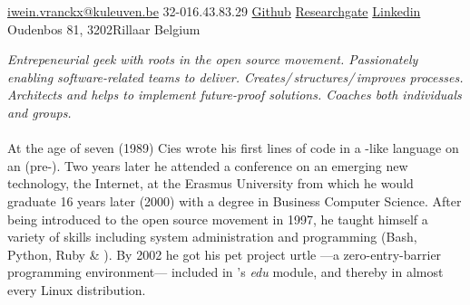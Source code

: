 \documentclass[10pt,a4paper]{article}
\begin{document}
\sloppy  %



\nobreakvspace{0.3em}  %

\noindent\href{mailto:ivranckx.at.kuleuven.dot.be}{\faInbox \; iwein.vranckx\mbox{}@\mbox{}kuleuven.be}\sbull
\faWhatsapp \; \textsmaller{+}32-016.43.83.29\sbull
\href{https://github.com/ivranckx}{\faGithub \; Github}\sbull
\href{https://www.researchgate.net/profile/Iwein_Vranckx}{\faPaperclip \; Researchgate}\sbull
\href{http://linkedin.com/in/ivranckx}{\faLinkedin \; Linkedin}
\\
\faMapMarker \; Oudenbos  81, 
3202\thinspace Rillaar\sbull%
Belgium

\spacedhrule{0.9em}{-0.4em}  %


\vspace{-1.3em}  %

\begin{multicols}{2}  %
\noindent \emph{Entrepeneurial geek with roots in the open source movement. Passionately enabling software-related teams to deliver. Creates/\,structures/\,improves processes. Architects and helps to implement future-proof solutions. Coaches both individuals and groups.}
\\
\\
At the age of seven (1989) Cies wrote his first lines of code in a -like language on an  (pre-).  Two years later he attended a conference on an emerging new technology, the Internet, at the Erasmus University from which he would graduate 16 years later (2000) with a degree in Business Computer Science.
After being introduced to the open source movement in 1997, he taught himself a variety of skills including system administration and programming (Bash, Python, Ruby \& \CPP).  By 2002 he got his pet project urtle ---a zero-entry-barrier programming environment--- included in 's \emph{edu} module, and thereby in almost every Linux distribution.
\end{multicols}
\end{document}
